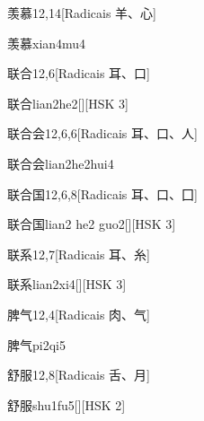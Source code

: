 \begin{entry}{羡慕}{12,14}[Radicais ⽺、⼼]
  \begin{phonetics}{羡慕}{xian4mu4}
  \end{phonetics}
\end{entry}

\begin{entry}{联合}{12,6}[Radicais ⽿、⼝]
  \begin{phonetics}{联合}{lian2he2}[][HSK 3]
  \end{phonetics}
\end{entry}

\begin{entry}{联合会}{12,6,6}[Radicais ⽿、⼝、⼈]
  \begin{phonetics}{联合会}{lian2he2hui4}
  \end{phonetics}
\end{entry}

\begin{entry}{联合国}{12,6,8}[Radicais ⽿、⼝、⼞]
  \begin{phonetics}{联合国}{lian2 he2 guo2}[][HSK 3]
  \end{phonetics}
\end{entry}

\begin{entry}{联系}{12,7}[Radicais ⽿、⽷]
  \begin{phonetics}{联系}{lian2xi4}[][HSK 3]
  \end{phonetics}
\end{entry}

\begin{entry}{脾气}{12,4}[Radicais ⾁、⽓]
  \begin{phonetics}{脾气}{pi2qi5}
  \end{phonetics}
\end{entry}

\begin{entry}{舒服}{12,8}[Radicais ⾆、⽉]
  \begin{phonetics}{舒服}{shu1fu5}[][HSK 2]
  \end{phonetics}
\end{entry}

